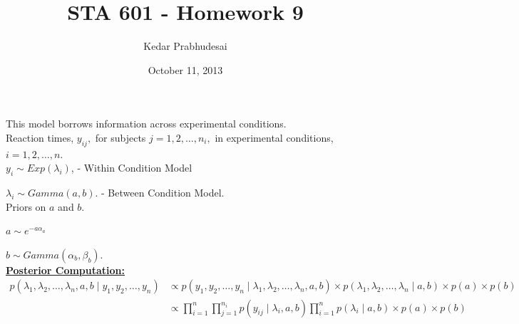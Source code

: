 \documentclass{article}
\title{STA 601 - Homework 9}
\author{Kedar Prabhudesai}
\date{October 11, 2013}
\begin{document}
\maketitle

 This model borrows information across experimental conditions. \\

Reaction times, $y_{ij},$ for subjects $j = 1,2,\ldots,n_i,$ in experimental conditions, $i = 1,2,\ldots,n.$\\

$y_{i} \sim Exp(\lambda_i)$, - Within Condition Model

$\lambda_i \sim Gamma(a,b).$ - Between Condition Model.\\

Priors on $a$ and $b.$

$a \sim e^{-a\alpha_a}$

$b \sim Gamma(\alpha_b,\beta_b).$\\

\noindent \underline{\textbf{Posterior Computation:}}\\
\begin{align*}
p(\lambda_1,\lambda_2,\ldots,\lambda_n,a,b \mid y_1,y_2,\ldots,y_n) &\propto p(y_1,y_2,\ldots,y_n \mid \lambda_1,\lambda_2,\ldots,\lambda_n,a,b) \times p(\lambda_1,\lambda_2,\ldots,\lambda_n \mid a,b) \times p(a) \times p(b)\\
&\propto \prod_{i=1}^{n}{\prod_{j=1}^{n_i}{p(y_{ij} \mid \lambda_i,a,b)}}\prod_{i=1}^{n}{p(\lambda_i \mid a,b)} \times p(a) \times p(b)
\end{align*}

\pagebreak
\end{document}
